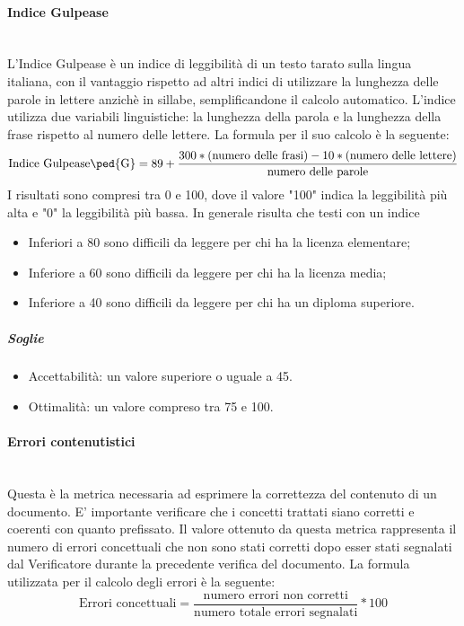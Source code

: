 \paragraph{Indice Gulpease}
	~\\L'{Indice Gulpease} è un indice di leggibilità di un testo tarato sulla lingua italiana, con il vantaggio rispetto ad altri indici di utilizzare la lunghezza delle parole in lettere anzichè in sillabe, semplificandone il calcolo automatico. L'indice utilizza due variabili linguistiche: la lunghezza della parola e la lunghezza della frase rispetto al numero delle lettere.
\newline La formula per il suo calcolo è la seguente:
\begin{displaymath}
\mbox{{Indice Gulpease}\ped{G}}= 89+\frac{300*\mbox{(numero delle frasi)}-10*\mbox{(numero delle lettere)}}{\mbox{numero delle parole}}
\end{displaymath}
I risultati sono compresi tra 0 e 100, dove il valore "100" indica la leggibilità più alta e "0" la leggibilità più bassa. In generale risulta che testi con un indice
\begin{itemize}
	\item Inferiori a 80 sono difficili da leggere per chi ha la licenza elementare;
	\item Inferiore a 60 sono difficili da leggere per chi ha la licenza media;
	\item Inferiore a 40 sono difficili da leggere per chi ha un diploma superiore.
\end{itemize}

\subparagraph{Soglie}
\begin{itemize}
\item Accettabilità: un valore superiore o uguale a 45.
\item Ottimalità: un valore compreso tra 75 e 100.
\end{itemize}

\paragraph{Errori contenutistici}
	~\\Questa è la metrica necessaria ad esprimere la correttezza del contenuto di un documento. E' importante verificare che i concetti trattati siano corretti e coerenti con quanto prefissato. Il valore ottenuto da questa metrica rappresenta il numero di errori concettuali che non sono stati corretti dopo esser stati segnalati dal {Verificatore} durante la precedente verifica del documento.
\newline La formula utilizzata per il calcolo degli errori è la seguente:
\begin{displaymath}
\mbox{Errori concettuali}=\frac{\mbox{numero errori non corretti}}{\mbox{numero totale errori segnalati}}*100
\end{displaymath}

